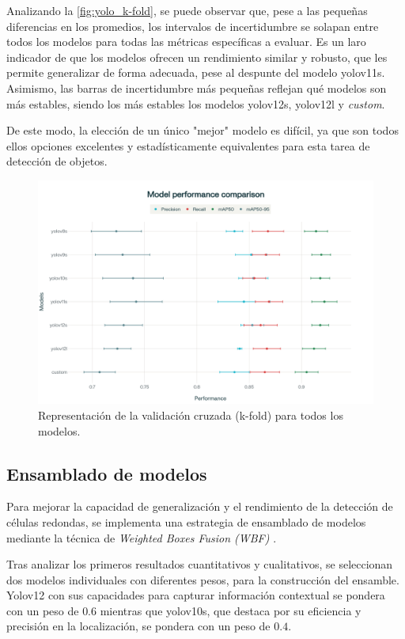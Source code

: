 \documentclass[12pt,a4paper,onecolumn,oneside]{report}
\begin{document}
Analizando la \autoref{fig:yolo_k-fold}, se puede observar que, pese a las pequeñas diferencias en los promedios, los intervalos de incertidumbre se solapan entre todos los modelos
para todas las métricas específicas a evaluar. Es un laro indicador de que los modelos ofrecen un rendimiento similar y robusto, que les permite generalizar de forma adecuada, pese al despunte del modelo yolov11s. 
Asimismo, las barras de incertidumbre más pequeñas reflejan qué modelos son más estables, siendo los más estables los modelos yolov12s, yolov12l y \textit{custom}.

De este modo, la elección de un único "mejor" modelo es difícil, ya que son todos ellos opciones excelentes y estadísticamente equivalentes para esta tarea de detección de objetos. 

\begin{figure}[H]
  \centering
  \includegraphics[width=1.0\textwidth]{figuras/k-fold/Yolo_k-fold.png}
  \caption{Representación de la validación cruzada (k-fold) para todos los modelos.}
  \label{fig:yolo_k-fold}
\end{figure}

\subsection{Ensamblado de modelos}

Para mejorar la capacidad de generalización y el rendimiento de la detección de células redondas, se implementa una estrategia de ensamblado de modelos mediante la técnica de \textit{Weighted Boxes Fusion (WBF)} \cite{repoTFM}. 

Tras analizar los primeros resultados cuantitativos y cualitativos, se seleccionan dos modelos individuales con diferentes pesos, para la construcción del ensamble. Yolov12 con sus capacidades 
para capturar información contextual se pondera con un peso de $0.6$ mientras que yolov10s, que destaca por su eficiencia y precisión en la localización, se pondera con un peso de $0.4$.
\end{document}
